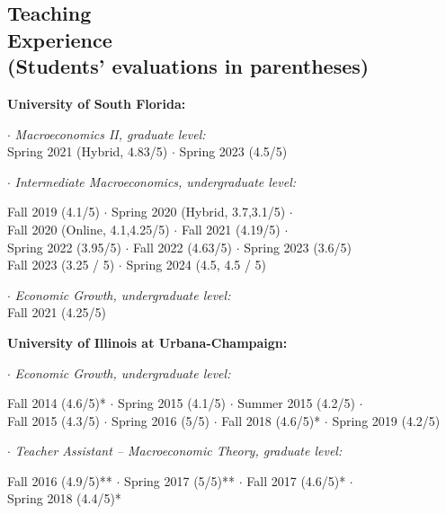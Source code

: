 \documentclass[mm, 10pt]{simple_style}
\begin{document}
\begin{resume}

\section{Teaching\\ Experience \\ {\protect\footnotesize (Students' evaluations in parentheses)}}

\textbf{University of South Florida:}

$\cdot$ \textit{Macroeconomics II, graduate level:} \\
\indent \hspace{1cm} Spring 2021 (Hybrid, 4.83/5) $\cdot$ Spring 2023 (4.5/5)

$\cdot$  \textit{Intermediate Macroeconomics, undergraduate level:}\\
\indent \hspace{1cm}  \begin{minipage}[t]{0.75\textwidth}
Fall 2019 (4.1/5) $\cdot$ Spring 2020 (Hybrid, 3.7,3.1/5) $\cdot$ \\
Fall 2020 (Online, 4.1,4.25/5) $\cdot$ Fall 2021 (4.19/5) $\cdot$ \\
Spring 2022 (3.95/5) $\cdot$ Fall 2022 (4.63/5) $\cdot$ Spring 2023 (3.6/5) \\
Fall 2023 (3.25 / 5) $\cdot$ Spring 2024 (4.5, 4.5 / 5)
\end{minipage}

$\cdot$  \textit{Economic Growth, undergraduate level:} \\
\indent \hspace{1cm}  Fall 2021 (4.25/5) 

\textbf{University of Illinois at Urbana-Champaign:}

$\cdot$ \textit{Economic Growth, undergraduate level:} \\
\indent \hspace{1cm}  \begin{minipage}[t]{0.8\textwidth}
Fall 2014 (4.6/5)* $\cdot$ Spring 2015 (4.1/5) $\cdot$ Summer 2015 (4.2/5) $\cdot$ \\
Fall 2015 (4.3/5) $\cdot$ Spring 2016 (5/5) $\cdot$ Fall 2018 (4.6/5)* $\cdot$ Spring 2019 (4.2/5)
\end{minipage}

$\cdot$ \textit{Teacher Assistant -- Macroeconomic Theory, graduate level:} \\
\indent \hspace{1cm}  \begin{minipage}[t]{0.75\textwidth}
Fall 2016 (4.9/5)** $\cdot$ Spring 2017 (5/5)** $\cdot$ Fall 2017 (4.6/5)* $\cdot$ \\
Spring 2018 (4.4/5)*
\end{minipage}


\end{resume}
\end{document}
